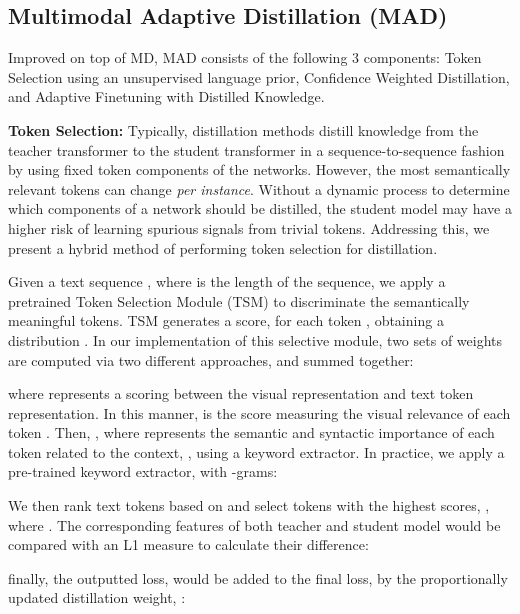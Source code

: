 \documentclass[runningheads]{llncs}
\begin{document}
\subsection{Multimodal Adaptive Distillation (MAD) }
Improved on top of MD, MAD consists of the following 3 components: Token Selection using an unsupervised language prior, Confidence Weighted Distillation, and Adaptive Finetuning with Distilled Knowledge.




{\bf \noindent Token Selection:} Typically, distillation methods \cite{sanh2019distilbert,jiao2019tinybert,kim2016sequence,sun2019patient} distill knowledge from the teacher transformer to the student transformer in a sequence-to-sequence fashion by using fixed token components of the networks. However, the most semantically relevant tokens can change {\em per instance}. Without a dynamic process to determine which components of a network should be distilled, the student model may have a higher risk of learning spurious signals from trivial tokens. Addressing this, we present a hybrid method of performing token selection for distillation.



Given a text sequence , where  is the length of the sequence, we apply a pretrained Token Selection Module (TSM)  to discriminate the semantically meaningful tokens. TSM generates a score,  for each token , obtaining a distribution . In our implementation of this selective module, two sets of weights are computed via two different approaches, and summed together:




\noindent where  represents a scoring between the visual representation and text token representation. In this manner,  is the score measuring the visual relevance of each token . Then, , where  represents
the semantic and syntactic importance of each token related to the context, , using a keyword extractor. In practice, we apply a pre-trained keyword extractor\cite{yake},  with -grams:





\noindent We then rank text tokens based on  and select  tokens with the highest scores, , where . The corresponding features of both teacher and student model would be compared with an L1 measure to calculate their difference:



\noindent finally, the outputted loss,  would be added to the final loss,  by the proportionally updated distillation weight, :
\end{document}
